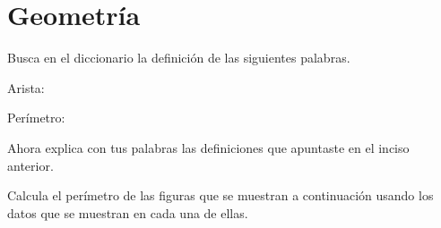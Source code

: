 \documentclass[11pt]{article}
\begin{document}
\vspace{1cm}

\section{Geometr\'ia}

Busca en el diccionario la definici\'on de las siguientes palabras. 

\vspace{5mm}

Arista:

\vspace{1.5cm}

Per\'imetro:

\vspace{2cm}


Ahora explica con tus palabras las definiciones que apuntaste en el inciso
anterior.

\vspace{4cm}


Calcula el per\'imetro de las figuras que se muestran a continuaci\'on usando
los datos que se muestran en cada una de ellas.
\end{document}
